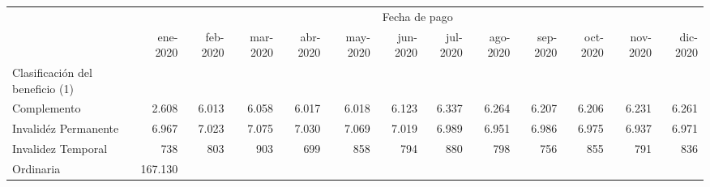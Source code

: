 \begin{tabular}{lllllllllllll}
\cline{1-13}
\multicolumn{1}{c}{} &
  \multicolumn{12}{|c}{Fecha de pago} \\
\multicolumn{1}{c}{} &
  \multicolumn{1}{|r}{ene-2020} &
  \multicolumn{1}{r}{feb-2020} &
  \multicolumn{1}{r}{mar-2020} &
  \multicolumn{1}{r}{abr-2020} &
  \multicolumn{1}{r}{may-2020} &
  \multicolumn{1}{r}{jun-2020} &
  \multicolumn{1}{r}{jul-2020} &
  \multicolumn{1}{r}{ago-2020} &
  \multicolumn{1}{r}{sep-2020} &
  \multicolumn{1}{r}{oct-2020} &
  \multicolumn{1}{r}{nov-2020} &
  \multicolumn{1}{r}{dic-2020} \\
\cline{1-13}
\multicolumn{1}{l}{Clasificación del beneficio (1)} &
  \multicolumn{1}{|r}{} &
  \multicolumn{1}{r}{} &
  \multicolumn{1}{r}{} &
  \multicolumn{1}{r}{} &
  \multicolumn{1}{r}{} &
  \multicolumn{1}{r}{} &
  \multicolumn{1}{r}{} &
  \multicolumn{1}{r}{} &
  \multicolumn{1}{r}{} &
  \multicolumn{1}{r}{} &
  \multicolumn{1}{r}{} &
  \multicolumn{1}{r}{} \\
\multicolumn{1}{l}{\hspace{1em}Complemento} &
  \multicolumn{1}{|r}{2.608} &
  \multicolumn{1}{r}{6.013} &
  \multicolumn{1}{r}{6.058} &
  \multicolumn{1}{r}{6.017} &
  \multicolumn{1}{r}{6.018} &
  \multicolumn{1}{r}{6.123} &
  \multicolumn{1}{r}{6.337} &
  \multicolumn{1}{r}{6.264} &
  \multicolumn{1}{r}{6.207} &
  \multicolumn{1}{r}{6.206} &
  \multicolumn{1}{r}{6.231} &
  \multicolumn{1}{r}{6.261} \\
\multicolumn{1}{l}{\hspace{1em}Invalidéz Permanente} &
  \multicolumn{1}{|r}{6.967} &
  \multicolumn{1}{r}{7.023} &
  \multicolumn{1}{r}{7.075} &
  \multicolumn{1}{r}{7.030} &
  \multicolumn{1}{r}{7.069} &
  \multicolumn{1}{r}{7.019} &
  \multicolumn{1}{r}{6.989} &
  \multicolumn{1}{r}{6.951} &
  \multicolumn{1}{r}{6.986} &
  \multicolumn{1}{r}{6.975} &
  \multicolumn{1}{r}{6.937} &
  \multicolumn{1}{r}{6.971} \\
\multicolumn{1}{l}{\hspace{1em}Invalidez Temporal} &
  \multicolumn{1}{|r}{738} &
  \multicolumn{1}{r}{803} &
  \multicolumn{1}{r}{903} &
  \multicolumn{1}{r}{699} &
  \multicolumn{1}{r}{858} &
  \multicolumn{1}{r}{794} &
  \multicolumn{1}{r}{880} &
  \multicolumn{1}{r}{798} &
  \multicolumn{1}{r}{756} &
  \multicolumn{1}{r}{855} &
  \multicolumn{1}{r}{791} &
  \multicolumn{1}{r}{836} \\
\multicolumn{1}{l}{\hspace{1em}Ordinaria} &
  \multicolumn{1}{|r}{167.130} &

\end{tabular}
